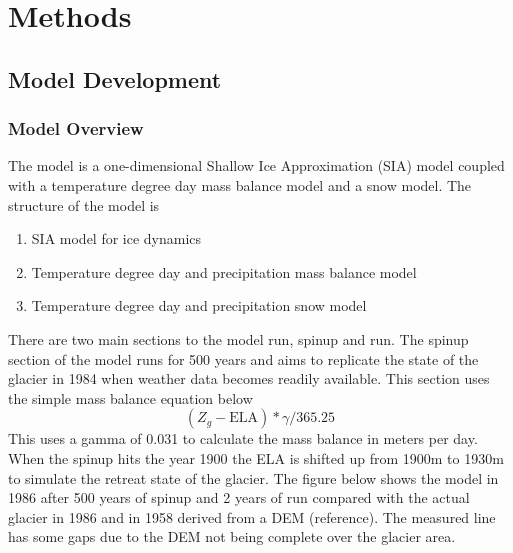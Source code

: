 \documentclass{article}
\begin{document}
\section{Methods}

\subsection{Model Development}
\subsubsection{Model Overview}

The model is a one-dimensional Shallow Ice Approximation (SIA) model coupled with a temperature degree day mass balance model and a snow model. 
The structure of the model is
\begin{enumerate}
    \item SIA model for ice dynamics
    \item Temperature degree day and precipitation mass balance model
    \item Temperature degree day and precipitation snow model
\end{enumerate}

There are two main sections to the model run, spinup and run. The spinup section of the model runs for 500 years and aims to replicate the 
state of the glacier in 1984 when weather data becomes readily available. This section uses the simple mass balance equation below
\begin{equation}(Z_g-\text{ELA})*\gamma /365.25\end{equation}
This uses a gamma of 0.031 to calculate the mass balance in meters per day. When the spinup hits the year 1900 the ELA is shifted up from 1900m to 1930m to simulate the 
retreat state of the glacier. The figure below shows the model in 1986 after 500 years of spinup and 2 years of run compared with the actual 
glacier in 1986 and in 1958 derived from a DEM (reference). The measured line has some gaps due to the DEM not being complete over the glacier area.
\end{document}
